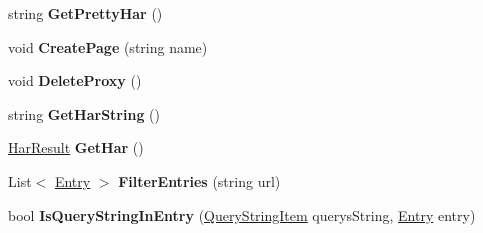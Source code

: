 \begin{DoxyCompactItemize}
\item 
\hypertarget{class_proto_test_1_1_golem_1_1_proxy_1_1_browser_mob_proxy_ac9b0630d9e6bccdccbf7b713050fce47}{string {\bfseries Get\-Pretty\-Har} ()}\label{class_proto_test_1_1_golem_1_1_proxy_1_1_browser_mob_proxy_ac9b0630d9e6bccdccbf7b713050fce47}

\item 
\hypertarget{class_proto_test_1_1_golem_1_1_proxy_1_1_browser_mob_proxy_a5c4554163596b9c321b6293b3e6d75d0}{void {\bfseries Create\-Page} (string name)}\label{class_proto_test_1_1_golem_1_1_proxy_1_1_browser_mob_proxy_a5c4554163596b9c321b6293b3e6d75d0}

\item 
\hypertarget{class_proto_test_1_1_golem_1_1_proxy_1_1_browser_mob_proxy_ae1ed87e633d0202c52c8c447592f0f9c}{void {\bfseries Delete\-Proxy} ()}\label{class_proto_test_1_1_golem_1_1_proxy_1_1_browser_mob_proxy_ae1ed87e633d0202c52c8c447592f0f9c}

\item 
\hypertarget{class_proto_test_1_1_golem_1_1_proxy_1_1_browser_mob_proxy_a4ec7a74b536cfb879f9de9d2e30b1ab7}{string {\bfseries Get\-Har\-String} ()}\label{class_proto_test_1_1_golem_1_1_proxy_1_1_browser_mob_proxy_a4ec7a74b536cfb879f9de9d2e30b1ab7}

\item 
\hypertarget{class_proto_test_1_1_golem_1_1_proxy_1_1_browser_mob_proxy_abd381f4e9c5f2daa6071125f688daad6}{\hyperlink{class_proto_test_1_1_golem_1_1_proxy_1_1_h_a_r_1_1_har_result}{Har\-Result} {\bfseries Get\-Har} ()}\label{class_proto_test_1_1_golem_1_1_proxy_1_1_browser_mob_proxy_abd381f4e9c5f2daa6071125f688daad6}

\item 
\hypertarget{class_proto_test_1_1_golem_1_1_proxy_1_1_browser_mob_proxy_ae44051826e737b979199e2efbf530e5d}{List$<$ \hyperlink{class_proto_test_1_1_golem_1_1_proxy_1_1_h_a_r_1_1_entry}{Entry} $>$ {\bfseries Filter\-Entries} (string url)}\label{class_proto_test_1_1_golem_1_1_proxy_1_1_browser_mob_proxy_ae44051826e737b979199e2efbf530e5d}

\item 
\hypertarget{class_proto_test_1_1_golem_1_1_proxy_1_1_browser_mob_proxy_acaf8900dd3aaa08c9d4a7e0240405cf5}{bool {\bfseries Is\-Query\-String\-In\-Entry} (\hyperlink{class_proto_test_1_1_golem_1_1_proxy_1_1_h_a_r_1_1_query_string_item}{Query\-String\-Item} querys\-String, \hyperlink{class_proto_test_1_1_golem_1_1_proxy_1_1_h_a_r_1_1_entry}{Entry} entry)}\label{class_proto_test_1_1_golem_1_1_proxy_1_1_browser_mob_proxy_acaf8900dd3aaa08c9d4a7e0240405cf5}


\end{DoxyCompactItemize}
